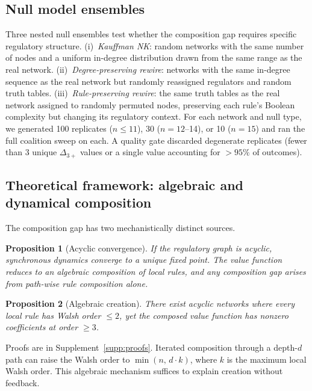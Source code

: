 \documentclass[10pt]{article}
\newtheorem{proposition}{Proposition}
\begin{document}
\subsection{Null model ensembles}
\label{sec:null-models}

Three nested null ensembles test whether the composition gap requires
specific regulatory structure. (i)~\emph{Kauffman NK}: random
networks with the same number of nodes and a uniform in-degree
distribution drawn from the same range as the real network.
(ii)~\emph{Degree-preserving rewire}: networks with the same
in-degree sequence as the real network but randomly reassigned
regulators and random truth tables. (iii)~\emph{Rule-preserving
rewire}: the same truth tables as the real network assigned to
randomly permuted nodes, preserving each rule's Boolean complexity
but changing its regulatory context. For each network and null type,
we generated 100 replicates ($n \leq 11$), 30 ($n = 12$--14), or 10
($n = 15$) and ran the full coalition sweep on each. A quality gate
discarded degenerate replicates (fewer than 3 unique $\Delta_{3+}$
values or a single value accounting for $> 95\%$ of outcomes).


\subsection{Theoretical framework: algebraic and dynamical composition}
\label{sec:theory}

The composition gap has two mechanistically distinct sources.

\begin{proposition}[Acyclic convergence]
\label{prop:dag}
If the regulatory graph is acyclic, synchronous dynamics converge to
a unique fixed point. The value function reduces to an algebraic
composition of local rules, and any composition gap arises from
path-wise rule composition alone.
\end{proposition}

\begin{proposition}[Algebraic creation]
\label{prop:creation}
There exist acyclic networks where every local rule has Walsh order
$\leq 2$, yet the composed value function has nonzero coefficients at
order $\geq 3$.
\end{proposition}

Proofs are in Supplement~\ref{supp:proofs}. Iterated composition
through a depth-$d$ path can raise the Walsh order to
$\min(n,\, d \cdot k)$, where $k$ is the maximum local Walsh order.
This algebraic mechanism suffices to explain creation without
feedback.
\end{document}
